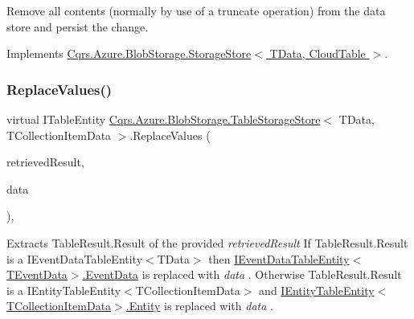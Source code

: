 Remove all contents (normally by use of a truncate operation) from the data store and persist the change. 



Implements \hyperlink{classCqrs_1_1Azure_1_1BlobStorage_1_1StorageStore_a4e848f342be903293812b3b660464d1a_a4e848f342be903293812b3b660464d1a}{Cqrs.\+Azure.\+Blob\+Storage.\+Storage\+Store$<$ T\+Data, Cloud\+Table $>$}.

\mbox{\label{classCqrs_1_1Azure_1_1BlobStorage_1_1TableStorageStore_adc625eceee6e2b190997a771740e01b9_adc625eceee6e2b190997a771740e01b9}} 
\subsubsection{\texorpdfstring{Replace\+Values()}{ReplaceValues()}}
{\footnotesize\ttfamily virtual I\+Table\+Entity \hyperlink{classCqrs_1_1Azure_1_1BlobStorage_1_1TableStorageStore}{Cqrs.\+Azure.\+Blob\+Storage.\+Table\+Storage\+Store}$<$ T\+Data, T\+Collection\+Item\+Data $>$.Replace\+Values (\begin{DoxyParamCaption}\item[{Table\+Result}]{retrieved\+Result,  }\item[{T\+Data}]{data }\end{DoxyParamCaption})\hspace{0.3cm}{\ttfamily [protected]}, {\ttfamily [virtual]}}



Extracts Table\+Result.\+Result of the provided {\itshape retrieved\+Result}  If Table\+Result.\+Result is a I\+Event\+Data\+Table\+Entity$<$\+T\+Data$>$ then \hyperlink{interfaceCqrs_1_1Azure_1_1BlobStorage_1_1IEventDataTableEntity_aa7b1f06172ce68c2cb2248be422edfe5_aa7b1f06172ce68c2cb2248be422edfe5}{I\+Event\+Data\+Table\+Entity$<$\+T\+Event\+Data$>$.\+Event\+Data} is replaced with {\itshape data} . Otherwise Table\+Result.\+Result is a I\+Entity\+Table\+Entity$<$\+T\+Collection\+Item\+Data$>$ and \hyperlink{interfaceCqrs_1_1Azure_1_1BlobStorage_1_1IEntityTableEntity_a06bd38e994772fa43bf8f456c1b3d6e2_a06bd38e994772fa43bf8f456c1b3d6e2}{I\+Entity\+Table\+Entity$<$\+T\+Collection\+Item\+Data$>$.\+Entity} is replaced with {\itshape data} . 


